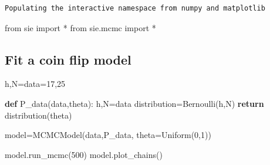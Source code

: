 \documentclass[]{article}
\date{}
\newenvironment{Shaded}{}{}
\newcommand{\KeywordTok}[1]{\textcolor[rgb]{0.00,0.44,0.13}{\textbf{{#1}}}}
\newcommand{\DecValTok}[1]{\textcolor[rgb]{0.25,0.63,0.44}{{#1}}}
\newcommand{\CharTok}[1]{\textcolor[rgb]{0.25,0.44,0.63}{{#1}}}
\newcommand{\NormalTok}[1]{{#1}}
\begin{document}
\begin{Shaded}
\begin{Highlighting}[]
\NormalTok{%
\end{Highlighting}
\end{Shaded}

\begin{verbatim}
Populating the interactive namespace from numpy and matplotlib
\end{verbatim}

\begin{Shaded}
\begin{Highlighting}[]
\CharTok{from} \NormalTok{sie }\CharTok{import} \NormalTok{*}
\CharTok{from} \NormalTok{sie.mcmc }\CharTok{import} \NormalTok{*}
\end{Highlighting}
\end{Shaded}

\subsection{Fit a coin flip model}\label{fit-a-coin-flip-model}

\begin{Shaded}
\begin{Highlighting}[]
\NormalTok{h,N=data=}\DecValTok{17}\NormalTok{,}\DecValTok{25}
\end{Highlighting}
\end{Shaded}

\begin{Shaded}
\begin{Highlighting}[]
\KeywordTok{def} \NormalTok{P_data(data,theta):}
    \NormalTok{h,N=data}
    \NormalTok{distribution=Bernoulli(h,N)}
    \KeywordTok{return} \NormalTok{distribution(theta)}
\end{Highlighting}
\end{Shaded}

\begin{Shaded}
\begin{Highlighting}[]
\NormalTok{model=MCMCModel(data,P_data,}
                \NormalTok{theta=Uniform(}\DecValTok{0}\NormalTok{,}\DecValTok{1}\NormalTok{))}
\end{Highlighting}
\end{Shaded}

\begin{Shaded}
\begin{Highlighting}[]
\NormalTok{model.run_mcmc(}\DecValTok{500}\NormalTok{)}
\NormalTok{model.plot_chains()}
\end{Highlighting}
\end{Shaded}
\end{document}

